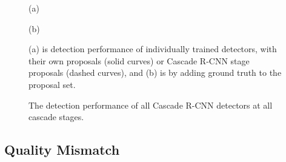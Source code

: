 \documentclass[10pt,twocolumn,letterpaper]{article}
\begin{document}
\begin{figure}[!t]
\begin{minipage}[b]{.48\linewidth}
\centering
\centerline{}{(a)}
\end{minipage}
\hfill
\begin{minipage}[b]{.48\linewidth}
\centering
\centerline{}{(b)}
\end{minipage}
\caption{(a) is detection performance of individually trained detectors, with their own proposals (solid curves) or Cascade R-CNN stage proposals (dashed curves), and (b) is by adding ground truth to the proposal set.}
\label{fig:hypotheses mismatch}
\end{figure}

\begin{figure}[!t]
\begin{minipage}[b]{.3\linewidth}
\centering
\centerline{}
\end{minipage}
\hfill
\begin{minipage}[b]{.3\linewidth}
\centering
\centerline{}
\end{minipage}
\hfill
\begin{minipage}[b]{.3\linewidth}
\centering
\centerline{}
\end{minipage}
\caption{The detection performance of all Cascade R-CNN detectors at all cascade
stages.}
\label{fig:cascade stage}
\end{figure}

\subsection{Quality Mismatch}
\end{document}
